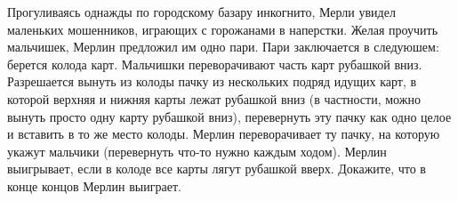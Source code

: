 \begin{problems}
\item Прогуливаясь однажды по городскому базару инкогнито, Мерли увидел маленьких мошенников, играющих с горожанами в наперстки. Желая проучить мальчишек, Мерлин предложил им одно пари. Пари заключается в следуюшем: берется колода карт. Мальчишки переворачивают часть карт рубашкой вниз. Разрешается вынуть из колоды пачку из нескольких подряд идущих карт, в которой верхняя и нижняя карты лежат рубашкой вниз (в частности, можно вынуть просто одну карту рубашкой вниз), перевернуть эту пачку как одно целое и вставить в то же место колоды. Мерлин переворачивает ту пачку, на которую укажут мальчики (перевернуть что-то нужно каждым ходом). Мерлин выигрывает, если в колоде все карты лягут рубашкой вверх. Докажите, что в конце концов Мерлин выиграет.

\end{problems}